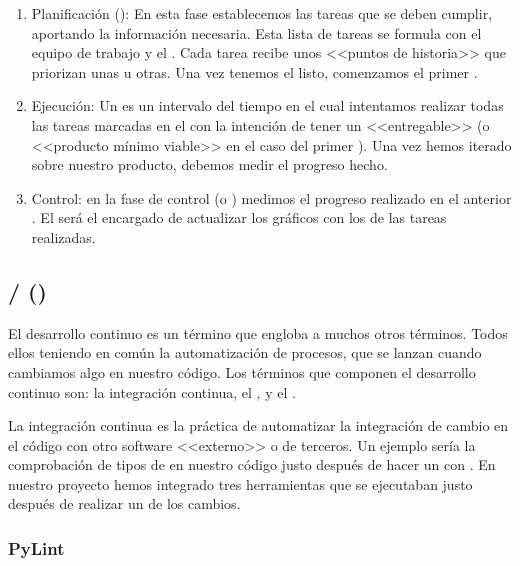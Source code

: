 \begin{enumerate}
  \item Planificación (): En esta fase establecemos las tareas que se deben cumplir, aportando la información necesaria. Esta lista de tareas se formula con el equipo de trabajo y el . Cada tarea recibe unos <<puntos de historia>> que priorizan unas u otras. Una vez tenemos el  listo, comenzamos el primer .

  \item Ejecución: Un  es un intervalo del tiempo en el cual intentamos realizar todas las tareas marcadas en el  con la intención de tener un <<entregable>> (o <<producto mínimo viable>> en el caso del primer ). Una vez hemos iterado sobre nuestro producto, debemos medir el progreso hecho.

  \item Control: en la fase de control (o ) medimos el progreso realizado en el anterior . El  será el encargado de actualizar los gráficos con los  de las tareas realizadas.
\end{enumerate}

\subsection{ /  ()}

El desarrollo continuo es un término que engloba a muchos otros términos. Todos ellos teniendo en común la automatización de procesos, que se lanzan cuando cambiamos algo en nuestro código. Los términos que componen el desarrollo continuo son: la integración continua, el ,  y el .

La integración continua es la práctica de automatizar la integración de cambio en el código con otro software <<externo>> o de terceros. Un ejemplo sería la comprobación de tipos de en nuestro código justo después de hacer un  con . En nuestro proyecto hemos integrado tres herramientas que se ejecutaban justo después de realizar un  de los cambios.

\subsubsection{PyLint}

